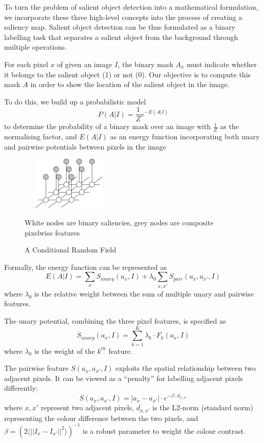 \documentclass[10pt,twocolumn,letterpaper]{article}
\newcommand{\SUM}{\sum\limits}
\begin{document}
To turn the problem of salient object detection into a mathematical formulation, we incorporate these three high-level concepts into the process of creating a saliency map.  Salient object detection can be thus formulated as a binary labelling task that separates a salient object from the background through multiple operations.


For each pixel $x$ of given an image $I$, the binary mask $A_x$ must indicate whether it belongs to the salient object (1) or not (0). Our objective is to compute this mask $A$ in order to show the location of the salient object in the image.

To do this, we build up a probabilistic model $$P(A|I)=\frac{1}{Z}e^{-E(A|I)}$$ to determine the probability of a binary mask over an image with $\frac{1}{Z}$ as the normalising factor, and $E(A|I)$ as an energy function incorporating both unary and pairwise potentials between pixels in the image

\begin{figure}[h]
    \begin{center}
        \includegraphics[width=1.8in,height=1in]{./Figures/mrf.jpg} \\
        \caption{A Conditional Random Field }
        \small White nodes are binary saliencies, grey nodes are composite pixelwise features
        \end{center}
\end{figure}

Formally, the energy function can be represented as $$E(A|I) = \SUM_x S_{unary}(a_x,I) + \lambda_0 \SUM_{x,x'}S_{pair}(a_x,a_{x'},I)$$ where $\lambda_0$ is the relative weight between the sum of multiple unary  and pairwise features. 


The unary potential, combining the three pixel features, is specified as $$S_{unary}(a_x,I) = \SUM_{k=1}^K \lambda_k \cdot F_k(a_x,I)$$ where $\lambda_k$ is the  weight of the $k^{th}$ feature. %

The pairwise feature $S(a_x,a_{x'},I)$ exploits the spatial relationship between two adjacent pixels.  It can be viewed as a ``penalty'' for labelling adjacent pixels differently: $$S(a_x,a_{x'},I) = |a_x-a_{x'}| \cdot e^{-\beta\cdot d_{x,x'}}$$ where $x,x'$ represent two adjacent pixels, $d_{x,x'}$ is the L2-norm (standard norm) representing the colour difference between the two pixels, and $\beta=(2\langle||I_x-I_{x'}||^2\rangle)^{-1}$ is a robust parameter to weight the colour contrast.
\end{document}
